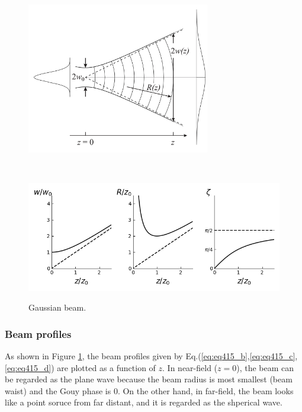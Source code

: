 \begin{figure}[p]
  \begin{minipage}{14cm}
    \centering    
    \includegraphics[width=8cm]{./img_chap4/img415a.png}
    \label{img:img415a}
  \end{minipage}\\
  \begin{minipage}{14cm}
    \centering        
    \includegraphics[width=14cm]{./img_chap4/img415.png}
    \label{img:img415}    
  \end{minipage}
  \caption{Gaussian beam.}
\end{figure}

\subsubsection{Beam profiles}
As shown in Figure \ref{img:img415}, the beam profiles given by Eq.(\ref{eq:eq415_b},\ref{eq:eq415_c},\ref{eq:eq415_d}) are plotted as a function of $z$. In near-field ($z=0$), the beam can be regarded as the plane wave because the beam radius is most smallest (beam waist) and the Gouy phase is 0. On the other hand, in far-field, the beam looks like a point soruce from far distant, and it is regarded as the shperical wave.

